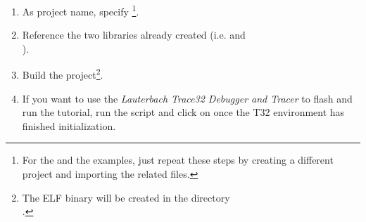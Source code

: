 \begin{enumerate}
\item As project name, specify \footnote{For the  and the  examples, just repeat these steps by creating a different project and importing the related files.}. 

\item Reference the two libraries already created (i.e. 
and \\ ).
\item Build the project\footnote{The ELF binary will be created in the
directory
\\ .}.
\item If you want to use the {\em Lauterbach Trace32 Debugger and Tracer}
\cite{Lauterbach} to flash and run the tutorial, run the 
script and click on  once the T32 environment has finished
initialization.



\end{enumerate}
